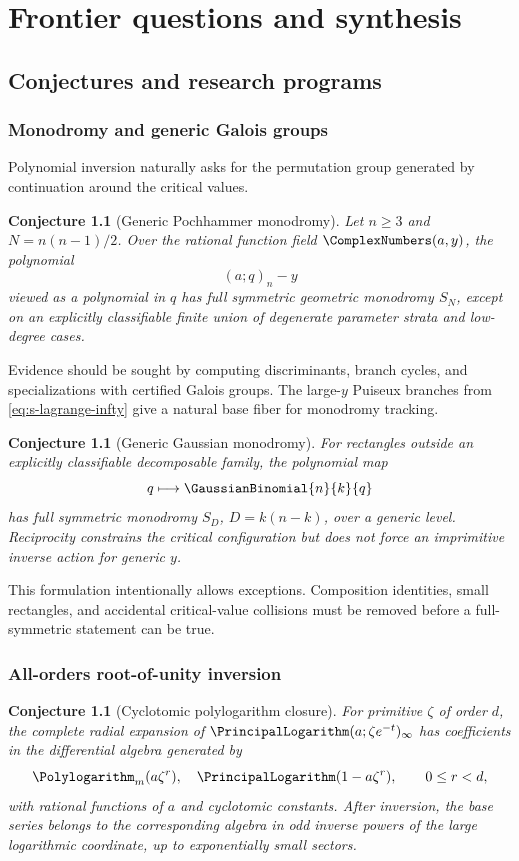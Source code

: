 \documentclass[11pt,oneside]{book}
\newtheorem{conjecture}[theorem]{Conjecture}
\theoremstyle{definition}
\theoremstyle{remark}
\begin{document}
\part{Frontier questions and synthesis}

\chapter{Conjectures and research programs}

\section{Monodromy and generic Galois groups}
Polynomial inversion naturally asks for the permutation group generated by
continuation around the critical values.

\begin{conjecture}[Generic Pochhammer monodromy]\label{conj:poch-monodromy}
Let $n\ge3$ and $N=n(n-1)/2$.  Over the rational function field
$\ComplexNumbers(a,y)$, the polynomial
\[
 (a;q)_n-y
\]
viewed as a polynomial in $q$ has full symmetric geometric monodromy
$S_N$, except on an explicitly classifiable finite union of degenerate
parameter strata and low-degree cases.
\end{conjecture}

Evidence should be sought by computing discriminants, branch cycles, and
specializations with certified Galois groups.  The large-$y$ Puiseux branches
from \eqref{eq:s-lagrange-infty} give a natural base fiber for monodromy
tracking.

\begin{conjecture}[Generic Gaussian monodromy]\label{conj:qbinom-monodromy}
For rectangles outside an explicitly classifiable decomposable family, the
polynomial map
\[
 q\longmapsto\GaussianBinomial{n}{k}{q}
\]
has full symmetric monodromy $S_D$, $D=k(n-k)$, over a generic level.
Reciprocity constrains the critical configuration but does not force an
imprimitive inverse action for generic $y$.
\end{conjecture}

This formulation intentionally allows exceptions.  Composition identities,
small rectangles, and accidental critical-value collisions must be removed
before a full-symmetric statement can be true.

\section{All-orders root-of-unity inversion}
\begin{conjecture}[Cyclotomic polylogarithm closure]\label{conj:cyclotomic-closure}
For primitive $\zeta$ of order $d$, the complete radial expansion of
$\PrincipalLogarithm(a;\zeta e^{-t})_\infty$ has coefficients in the differential algebra
generated by
\[
 \Polylogarithm_m(a\zeta^r),\quad \PrincipalLogarithm(1-a\zeta^r),
 \qquad 0\le r<d,
\]
with rational functions of $a$ and cyclotomic constants.  After inversion, the
base series belongs to the corresponding algebra in odd inverse powers of the
large logarithmic coordinate, up to exponentially small sectors.
\end{conjecture}
\end{document}
